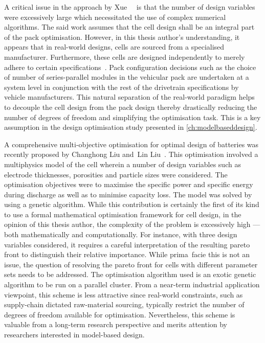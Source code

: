 
A critical issue in the approach  by Xue~\etal~\cite{Xue2014} is that the number
of design variables were excessively large which necessitated the use of complex
numerical  algorithms.  The  said  work  assumes  that  the  cell  design  shall
be  an  integral  part  of  the  pack  optimisation.  However,  in  this  thesis
author's  understanding,  it  appears  that in  real-world  designs,  cells  are
sourced from a  specialised manufacturer. Furthermore, these  cells are designed
independently to merely  adhere to certain specifications~\cite{Maksimovic2012}.
Pack configuration  decisions such  as the choice  of number  of series-parallel
modules in  the vehicular pack are  undertaken at a system  level in conjunction
with the  rest of the  drivetrain specifications by vehicle  manufacturers. This
natural separation of the real-world paradigm  helps to decouple the cell design
from  the pack  design thereby  drastically reducing  the number  of degrees  of
freedom and simplifying  the optimisation task. This is a  key assumption in the
design optimisation study presented in \cref{ch:modelbaseddesign}.

A  comprehensive multi-objective  optimisation for  optimal design  of batteries
was  recently  proposed  by  Changhong  Liu  and~Lin  Liu~\cite{Liu2017b}.  This
optimisation  involved a  multiphysics model  of the  cell wherein  a number  of
design variables  such as electrode  thicknesses, porosities and  particle sizes
were considered. The optimisation objectives were to maximise the specific power
and specific energy  during discharge as well as to  minimise capacity loss. The
model  was solved  by  using a  genetic algorithm.  While  this contribution  is
certainly  the first  of  its kind  to use  a  formal mathematical  optimisation
framework for cell design, in the  opinion of this thesis author, the complexity
of the problem is excessively  high --- both mathematically and computationally.
For  instance, with  three design  variables considered,  it requires  a careful
interpretation  of the  resulting  pareto front  to  distinguish their  relative
importance. While  prima~facie this is not  an issue, the question  of resolving
the pareto front for cells with  different parameter sets needs to be addressed.
The optimisation algorithm  used is an exotic  genetic algorithm to be  run on a
parallel cluster. From a near-term industrial application viewpoint, this scheme
is less attractive  since real-world constraints, such  as supply-chain dictated
raw-material  sourcing, typically  restrict  the number  of  degrees of  freedom
available  for  optimisation.  Nevertheless,  this scheme  is  valuable  from  a
long-term research perspective and merits attention by researchers interested in
model-based design.

